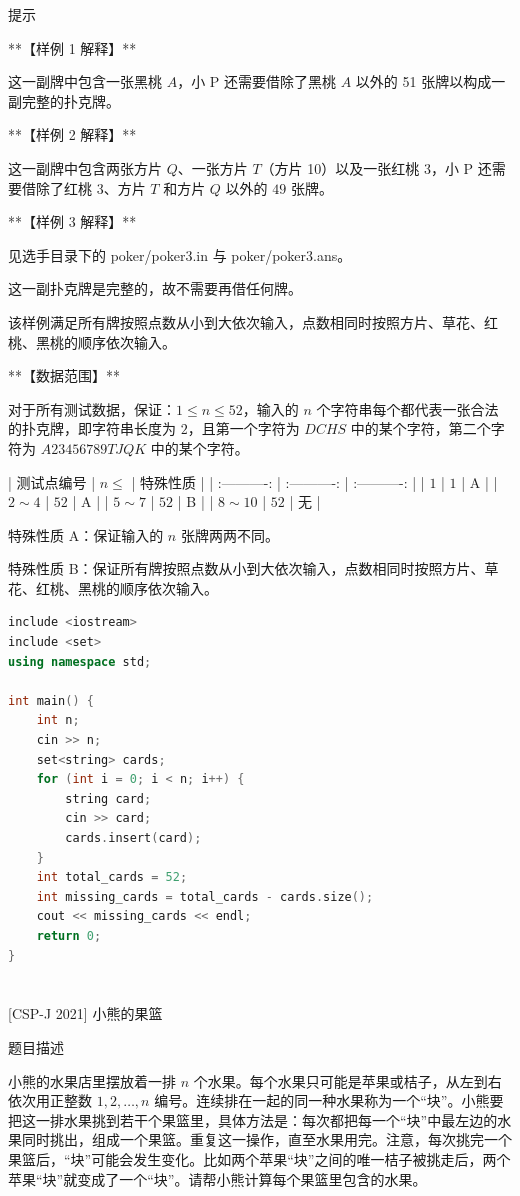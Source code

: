 \documentclass[12pt,twiside,a4paper]{ctexbook}
\numberwithin{chapter}{part}
\begin{document}
 提示

**【样例 1 解释】**

这一副牌中包含一张黑桃 $ A$，小 P 还需要借除了黑桃 $ A$ 以外的 51 张牌以构成一副完整的扑克牌。

**【样例 2 解释】**

这一副牌中包含两张方片 $ Q$、一张方片 $ T$（方片 10）以及一张红桃 3，小 P 还需要借除了红桃 3、方片 $ T$ 和方片 $ Q$ 以外的 $49$ 张牌。

**【样例 3 解释】**

见选手目录下的 poker/poker3.in 与 poker/poker3.ans。

这一副扑克牌是完整的，故不需要再借任何牌。

该样例满足所有牌按照点数从小到大依次输入，点数相同时按照方片、草花、红桃、黑桃的顺序依次输入。

**【数据范围】**

对于所有测试数据，保证：$1 \leq n \leq 52$，输入的 $n$ 个字符串每个都代表一张合法的扑克牌，即字符串长度为 $2$，且第一个字符为 ${D C H S}$ 中的某个字符，第二个字符为 ${A 2 3 4 5 6 7 8 9 T J Q K}$ 中的某个字符。

| 测试点编号 | $n \leq$ | 特殊性质 |
| :----------: | :----------: | :----------: |
| $1$ | $1$ | A |
| $2\sim 4$ | $52$ | A |
| $5\sim 7$ | $52$ | B |
| $8\sim 10$ | $52$ | 无 |

特殊性质 A：保证输入的 $n$ 张牌两两不同。

特殊性质 B：保证所有牌按照点数从小到大依次输入，点数相同时按照方片、草花、红桃、黑桃的顺序依次输入。
\begin{lstlisting}[language=c++,breaklines=true]
include <iostream>
include <set>
using namespace std;

int main() {
    int n;
    cin >> n;
    set<string> cards;
    for (int i = 0; i < n; i++) {
        string card;
        cin >> card;
        cards.insert(card);
    }
    int total_cards = 52;
    int missing_cards = total_cards - cards.size();
    cout << missing_cards << endl;
    return 0;
}
\end{lstlisting}

\section{}
 [CSP-J 2021] 小熊的果篮

 题目描述

小熊的水果店里摆放着一排 $n$ 个水果。每个水果只可能是苹果或桔子，从左到右依次用正整数 $1, 2, \ldots, n$ 编号。连续排在一起的同一种水果称为一个“块”。小熊要把这一排水果挑到若干个果篮里，具体方法是：每次都把每一个“块”中最左边的水果同时挑出，组成一个果篮。重复这一操作，直至水果用完。注意，每次挑完一个果篮后，“块”可能会发生变化。比如两个苹果“块”之间的唯一桔子被挑走后，两个苹果“块”就变成了一个“块”。请帮小熊计算每个果篮里包含的水果。
\end{document}
